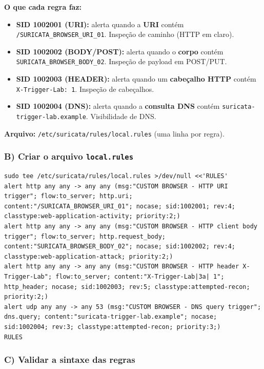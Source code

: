 \begin{notebox}
\textbf{O que cada regra faz:}
\begin{itemize}
  \item \textbf{SID 1002001 (URI):} alerta quando a \textbf{URI} contém \texttt{/SURICATA\_BROWSER\_URI\_01}. Inspeção de caminho (HTTP em claro).
  \item \textbf{SID 1002002 (BODY/POST):} alerta quando o \textbf{corpo} contém \texttt{SURICATA\_BROWSER\_BODY\_02}. Inspeção de payload em POST/PUT.
  \item \textbf{SID 1002003 (HEADER):} alerta quando um \textbf{cabeçalho HTTP} contém \texttt{X-Trigger-Lab: 1}. Inspeção de cabeçalhos.
  \item \textbf{SID 1002004 (DNS):} alerta quando a \textbf{consulta DNS} contém \texttt{suricata-trigger-lab.example}. Visibilidade de DNS.
\end{itemize}
\textbf{Arquivo:} \texttt{/etc/suricata/rules/local.rules} (uma linha por regra).
\end{notebox}

\subsubsection*{B) Criar o arquivo \texttt{local.rules}}

\begin{lstlisting}
sudo tee /etc/suricata/rules/local.rules >/dev/null <<'RULES'
alert http any any -> any any (msg:"CUSTOM BROWSER - HTTP URI trigger"; flow:to_server; http.uri; content:"/SURICATA_BROWSER_URI_01"; nocase; sid:1002001; rev:4; classtype:web-application-activity; priority:2;)
alert http any any -> any any (msg:"CUSTOM BROWSER - HTTP client body trigger"; flow:to_server; http.request_body; content:"SURICATA_BROWSER_BODY_02"; nocase; sid:1002002; rev:4; classtype:web-application-attack; priority:2;)
alert http any any -> any any (msg:"CUSTOM BROWSER - HTTP header X-Trigger-Lab"; flow:to_server; content:"X-Trigger-Lab|3a| 1"; http_header; nocase; sid:1002003; rev:5; classtype:attempted-recon; priority:2;)
alert udp any any -> any 53 (msg:"CUSTOM BROWSER - DNS query trigger"; dns.query; content:"suricata-trigger-lab.example"; nocase; sid:1002004; rev:3; classtype:attempted-recon; priority:3;)
RULES
\end{lstlisting}


\subsubsection*{C) Validar a sintaxe das regras}

